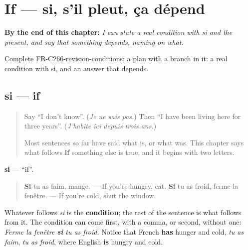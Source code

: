 
\chapter{If — si, s'il pleut, ça dépend}
\label{ch:fr-if}

\begin{chapteropening}
\textbf{By the end of this chapter:} \emph{I can state a real condition with si and the present, and say that something depends, naming on what.}

Complete FR-C266-revision-conditions: a plan with a branch in it: a real condition with si, and an answer that depends.
\end{chapteropening}

\section[si, s'il]{si — if}

\label{lesson:FR-C266-si}



\begin{quote}
Say \textquotedblleft{}I don't know\textquotedblright{}. (\emph{Je ne sais pas.}) Then \textquotedblleft{}I have been living here for three years\textquotedblright{}. (\emph{J'habite ici depuis trois ans.})

Most sentences so far have said what is, or what was. This chapter says what follows \textbf{if} something else is true, and it begins with two letters.
\end{quote}

\begin{grammarlens}[title={Grammar Lens: si opens a condition}]
\textbf{si} — \textquotedblleft{}if\textquotedblright{}.

\begin{quote}
\textbf{Si} tu as faim, mange. — If you're hungry, eat. \textbf{Si} tu as froid, ferme la fenêtre. — If you're cold, shut the window.
\end{quote}

Whatever follows \emph{si} is the \textbf{condition}; the rest of the sentence is what follows from it. The condition can come first, with a comma, or second, without one: \emph{Ferme la fenêtre \textbf{si} tu as froid.} Notice that French \textbf{has} hunger and cold, \emph{tu as faim}, \emph{tu as froid}, where English \textbf{is} hungry and cold.
\end{grammarlens}

